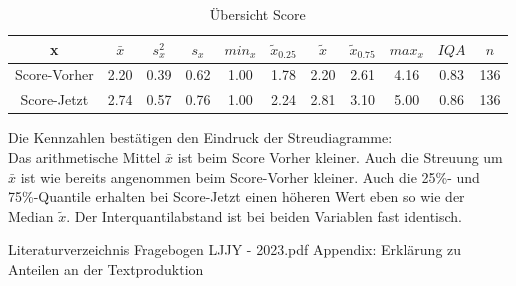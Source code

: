 \documentclass[11pt, a4paper]{article}
\begin{document}
\begin{table}[htb]
	\vspace{-1.5cm}
	\centering
	\begin{tabular}{c|ccccccccc|c}
		x & $\bar{x}$ & $s_x^2$ & $s_x$ & $min_x$ & $\tilde{x}_{0.25}$ & $\tilde{x}$ & $\tilde{x}_{0.75}$ & $max_x$ & $IQA$ & $n$ \\ \hline
		Score-Vorher & 2.20 & 0.39 & 0.62 & 1.00 & 1.78 & 2.20 & 2.61 & 4.16 & 0.83 & 136 \\
		Score-Jetzt & 2.74 & 0.57 & 0.76 & 1.00 & 2.24 & 2.81 & 3.10 & 5.00 & 0.86 & 136
	\end{tabular}
	\caption{Übersicht Score}
\end{table}
	Die Kennzahlen bestätigen den Eindruck der Streudiagramme:\\
Das arithmetische Mittel $\bar{x}$ ist beim Score Vorher kleiner.
Auch die Streuung um $\bar{x}$ ist wie bereits angenommen beim Score-Vorher kleiner. Auch die 25\%- und 75\%-Quantile erhalten bei Score-Jetzt einen höheren Wert eben so wie der Median $\tilde{x}$.
Der Interquantilabstand ist bei beiden Variablen fast identisch.


\leavevmode

\newpage
 Literaturverzeichnis
\newpage 
 {Fragebogen LJJY - 2023.pdf}
\newpage Appendix: Erklärung zu Anteilen an der Textproduktion
\end{document}
